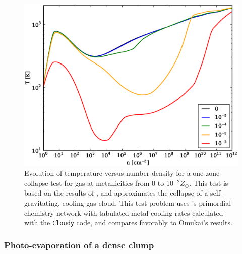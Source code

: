 \begin{figure}
  \begin{center}
    \includegraphics[width=1.0\textwidth]{figures/OneZoneCollapseTest.eps}
  \end{center}
  \caption{Evolution of temperature versus number density for a
one-zone collapse test for gas at metallicities from 0 to 10$^{-2}
Z_{\odot}$.  This test is based on the results of
\citet{2005ApJ...626..627O}, and approximates the collapse of a
self-gravitating, cooling gas cloud.  This test problem uses \enzo's
primordial chemistry network with tabulated metal cooling rates
calculated with the \texttt{Cloudy} code, and compares favorably to
Omukai's results.}
  \label{fig.onezone}
\end{figure}


\subsubsection{Photo-evaporation of a dense clump}
\label{sec.tests.raytracing}

